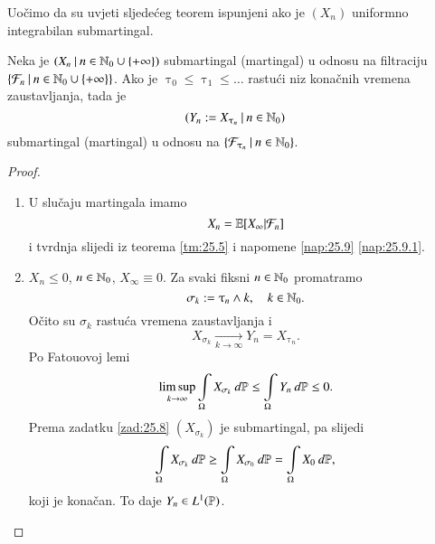 Uo\v cimo da su uvjeti sljede\' ceg teorem ispunjeni ako je $(X_n)$ uniformno integrabilan submartingal.

\begin{tm}  \label{tm:25.10}
    Neka je $({X_n} \: | \: {n \in \mathbb{N}_0 \cup \{+ \infty\}})$ submartingal (martingal) u odnosu na filtraciju $\{{\mathcal{F}_n} \: | \: {n \in \mathbb{N}_0 \cup \{+ \infty\}}\}$.
    Ako je $\uptau_0 \leq \uptau_1 \leq \ldots$ rastu\' ci niz kona\v cnih vremena zaustavljanja, tada je
    \begin{equation*}
        ({Y_n := X_{\uptau_n}} \: | \: {n \in \mathbb{N}_0})
    \end{equation*}
    submartingal (martingal) u odnosu na $\{{\mathcal{F}_{\uptau_n}} \: | \: {n \in \mathbb{N}_0}\}$.
\end{tm}

\begin{proof}
    \begin{enumerate}[label=(\alph*)]
        \item   \label{proof:25.10.1}
        U slu\v caju martingala imamo
        \begin{equation*}
            X_n = \mathbb{E} [X_\infty | \mathcal{F}_n]
        \end{equation*}
        i tvrdnja slijedi iz teorema \ref{tm:25.5} i napomene \ref{nap:25.9} \ref{nap:25.9.1}.
        \item   \label{proof:25.10.2}
        $X_n \leq 0$, $n \in \mathbb{N}_0$, $X_\infty \equiv 0$.
        Za svaki fiksni $n \in \mathbb{N}_0$ promatramo
        \begin{equation*}
            \sigma_k := \uptau_n \land k, \quad k \in \mathbb{N}_0.
        \end{equation*}
        O\v cito su $\sigma_k$ rastu\' ca vremena zaustavljanja i
        \begin{equation*}
            X_{\sigma_k} \xrightarrow[k \to \infty]{} Y_n = X_{\uptau_n}.
        \end{equation*}
        Po Fatouovoj lemi
        \begin{equation*}
            \limsup\limits_{k \to \infty} \int\limits_\Omega X_{\sigma_k} \: d \mathbb{P} \leq \int\limits_\Omega Y_n \: d \mathbb{P} \leq 0.
        \end{equation*}
        Prema zadatku \ref{zad:25.8} $(X_{\sigma_k})$ je submartingal, pa slijedi
        \begin{equation*}
            \int\limits_\Omega X_{\sigma_k} \: d \mathbb{P} \geq \int\limits_\Omega X_{\sigma_0} \: d \mathbb{P} = \int\limits_\Omega X_0 \: d \mathbb{P},
        \end{equation*}
        koji je kona\v can.
        To daje $Y_n \in L^1 (\mathbb{P})$.
        

\end{enumerate}
\end{proof}
